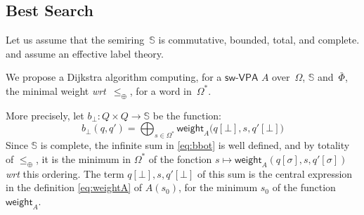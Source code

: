 \documentclass[runningheads]{llncs}
\def\wrt{\textit{wrt}\xspace}
\newcommand{\config}[2]{\ensuremath{#1}[{#2}]}
\newcommand{\Semiring}{\mathbb{S}}
\def\SWVPA{\textsf{sw-VPA}\xspace}
\def\weight{\mathsf{weight}}
\newcommand{\call}[1]{\ensuremath #1} %
\newcommand{\return}[1]{\ensuremath #1} %
\def\Omegai{{\Omega_\mathsf{i}}}
\def\Omegac{{\Omega_\mathsf{c}}}
\def\Omegar{{\Omega_\mathsf{r}}}
\def\Phii{{\Phi_\mathsf{i}}}
\def\Phir{{\Phi_\mathsf{r}}}
\def\Phicr{{\Phi_\mathsf{cr}}}
\begin{document}
\subsection{Best Search} 
\label{sec:best}\label{sec:search}
Let us assume that the semiring~$\Semiring$ is
commutative, bounded, total, and complete.
and assume an effective label theory.


We propose a Dijkstra algorithm computing, for a $\SWVPA$ $A$
over~$\Omega$, $\Semiring$ and~$\bar\Phi$, 
the minimal weight \wrt~$\leq_\oplus$, for a word in~$\Omega^*$.

\noindent
More precisely, 
let $b_\bot : Q \times Q \to \Semiring$ be the function:
%
\begin{equation}\label{eq:bbot}
  b_\bot(q, q') = \bigoplus_{s\in \Omega^*} 
  \textstyle
  \weight_A\bigl(\config{q}{\bot}, s, \config{q'}{\bot}\bigr)
\end{equation}
%
Since $\Semiring$ is complete, the infinite sum in \eqref{eq:bbot} is well defined,
and by totality of $\leq_\oplus$, it is the minimum in $\Omega^*$
of the fonction 
$s \mapsto \weight_A(\config{q}{\sigma}, s, \config{q'}{\sigma})$ 
\wrt this ordering.
%
The term $\config{q}{\bot}, s, \config{q'}{\bot}$ 
of this sum is the central expression in 
the definition \eqref{eq:weightA} of $A(s_0)$, for the minimum $s_0$
of the function $\weight_A$.
\end{document}
